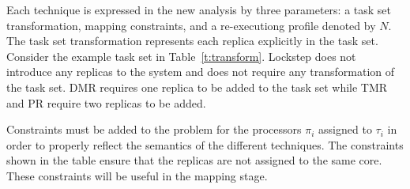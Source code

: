 	
	Each technique is expressed in the new analysis by three parameters: a task set transformation, mapping constraints, and a re-executiong profile denoted by $N$.
	The task set transformation represents each replica explicitly in the task set. 
	Consider the example task set in Table~\ref{t:transform}. 
	Lockstep does not introduce any replicas to the system and does not require any transformation of the task set. 
	DMR requires one replica to be added to the task set while TMR and PR require two replicas to be added.
	
	Constraints must be added to the problem for the processors $\pi_i$ assigned to $\tau_i$ in order to properly reflect the semantics of the different techniques. 
	The constraints shown in the table ensure that the replicas are not assigned to the same core. 
	These constraints will be useful in the mapping stage.
	
